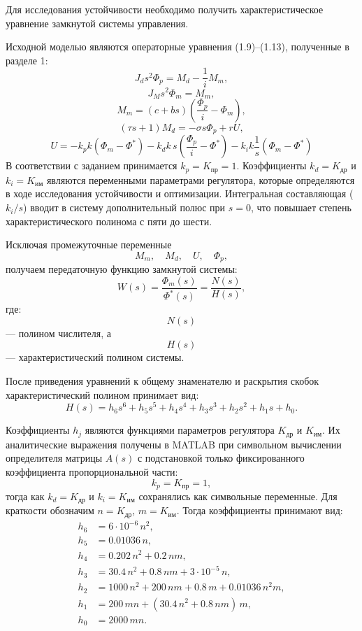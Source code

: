 \documentclass[a4paper, 14pt]{extarticle}
\begin{document}
Для исследования устойчивости необходимо получить характеристическое уравнение замкнутой системы управления.

Исходной моделью являются операторные уравнения (1.9)–(1.13), полученные в разделе 1:
\[
    J_d s^2 \Phi_p
    =
    M_d-\frac{1}{i}M_m,
\]
\[
    J_M s^2 \Phi_m=M_m,
\]
\[
    M_m=
    (c+bs)
    \left(
    \frac{\Phi_p}{i}-\Phi_m
    \right),
\]
\[
    (\tau s+1)M_d=
    -\sigma s\Phi_p+rU,
\]
\[
    U=
    -k_pk(\Phi_m-\Phi^*)
    -k_dk\,s
    \left(
    \frac{\Phi_p}{i}
    -\Phi^*
    \right)
    -k_ik
    \frac{1}{s}
    (\Phi_m-\Phi^*)
\]
В соответствии с заданием принимается $k_p = K_{\text{пр}} = 1$.
Коэффициенты $k_d = K_{\text{др}}$ и $k_i = K_{\text{им}}$ являются
переменными параметрами регулятора, которые определяются
в ходе исследования устойчивости и оптимизации.
Интегральная составляющая ($k_i/s$) вводит в систему
дополнительный полюс при $s=0$, что повышает степень
характеристического полинома с пяти до шести.

Исключая промежуточные переменные
\[
    M_m,\quad
    M_d,\quad
    U,\quad
    \Phi_p,
\]
получаем передаточную функцию замкнутой системы:
\[
    W(s)=
    \frac{\Phi_m(s)}{\Phi^*(s)}
    =
    \frac{N(s)}{H(s)},
\]
где:
\[
    N(s)
\]
— полином числителя,
а
\[
    H(s)
\]
— характеристический полином системы.

После приведения уравнений к общему знаменателю и раскрытия скобок характеристический полином принимает вид:
\[
    H(s)=
    h_6 s^6+
    h_5 s^5+
    h_4 s^4+
    h_3 s^3+
    h_2 s^2+
    h_1 s+
    h_0.
\]

Коэффициенты $h_j$ являются функциями параметров регулятора $K_{\text{др}}$ и $K_{\text{им}}$.
Их аналитические выражения получены в MATLAB при символьном
вычислении определителя матрицы $A(s)$ с подстановкой только
фиксированного коэффициента пропорциональной части:
\[
    k_p = K_{\text{пр}} = 1,
\]
тогда как $k_d = K_{\text{др}}$ и $k_i = K_{\text{им}}$ сохранялись
как символьные переменные.
Для краткости обозначим $n = K_{\text{др}}$, $m = K_{\text{им}}$.
Тогда коэффициенты принимают вид:
\begin{align}
    h_6 & = 6\cdot10^{-6}\, n^2,                                \\
    h_5 & = 0.01036\, n,                                        \\
    h_4 & = 0.202\, n^2 + 0.2\, n m,                            \\
    h_3 & = 30.4\, n^2 + 0.8\, n m + 3\cdot10^{-5}\, n,         \\
    h_2 & = 1000\, n^2 + 200\, n m + 0.8\, m + 0.01036\, n^2 m, \\
    h_1 & = 200\, m n + (30.4\, n^2 + 0.8\, n m)\, m,           \\
    h_0 & = 2000\, m n.
\end{align}
\end{document}
